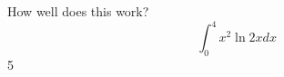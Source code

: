 \documentclass{article}
\begin{document}
How well does this work?
$$\int_0^4 x^2 \ln{2x}dx$$
5
\end{document}
